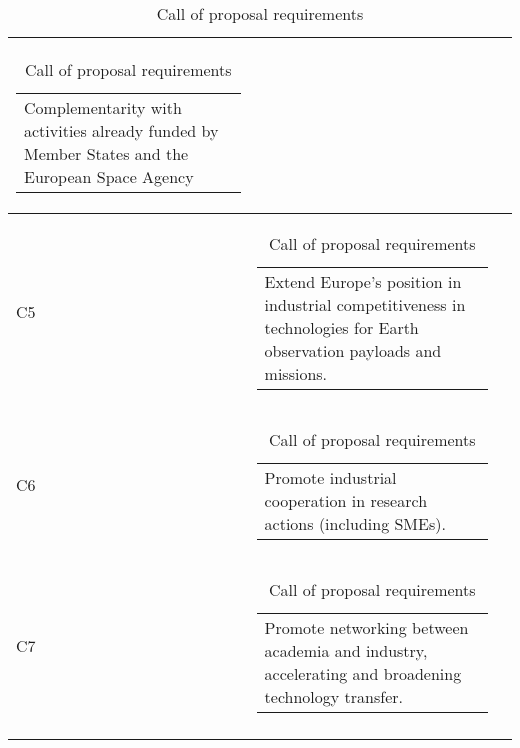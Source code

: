 \begin{longtable}[H]{l c c}
\begin{tabular}[c]{@{}l@{}}
\begin{minipage}[t]{\linewidth}
Complementarity with activities already funded by Member States and the European Space Agency \vspace{0.3cm}
	\end{minipage} \end{tabular}                                                                                                                                           \\  \midrule
	C5 & \begin{tabular}[c]{@{}l@{}}\begin{minipage}[t]{\linewidth}
Extend Europe's position in industrial competitiveness in technologies for Earth observation payloads and missions. \vspace{0.3cm}
	\end{minipage} \end{tabular}                                                                                                                                             \\  \midrule
	C6 & \begin{tabular}[c]{@{}l@{}}\begin{minipage}[t]{\linewidth}
			Promote industrial cooperation in research actions (including SMEs). \vspace{0.3cm}
	\end{minipage} \end{tabular}                                                                                                                                          \\  \midrule
	C7 & \begin{tabular}[c]{@{}l@{}}\begin{minipage}[t]{\linewidth}
			Promote networking between academia and industry, accelerating and broadening technology transfer. \vspace{0.3cm}
	\end{minipage} \end{tabular}                                                                                                                                             \\                                                                   	\bottomrule[2pt]
	\caption{Call of proposal requirements}
\end{longtable}
\newpage
